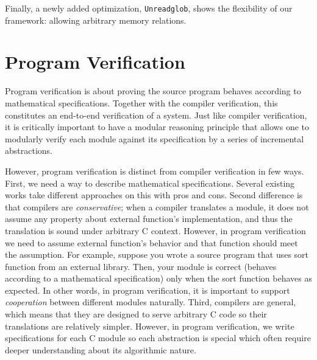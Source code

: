 Finally, a newly added optimization, \texttt{Unreadglob}, shows the flexibility of our framework:
allowing arbitrary memory relations.





\section{Program Verification}\label{sec:overview:program}

Program verification is about proving the source program behaves according to mathematical specifications.
Together with the compiler verification, this constitutes an end-to-end verification of a system.
Just like compiler verification, it is critically important to have a modular reasoning principle that allows one to modularly verify each module against its specification by a series of incremental abstractions.

However, program verification is distinct from compiler verification in few ways.
%
First, we need a way to describe mathematical specifications. Several existing works \cite{lorch:armada, jung:irisjfp, VST, gu:dscal} take different approaches on this with pros and cons.
%
Second difference is that compilers are {\it conservative}; when a compiler translates a module, it does not assume any property about external function's implementation, and thus the translation is sound under arbitrary C context.
However, in program verification we need to assume external function's behavior and that function should meet the assumption.
For example, suppose you wrote a source program that uses sort function from an external library.
Then, your module is correct (behaves according to a mathematical specification) only when the sort function behaves as expected.
In other words, in program verification, it is important to support {\it cooperation} between different modules naturally.
%
Third, compilers are general, which means that they are designed to serve arbitrary C code so their translations are relatively simpler.
However, in program verification, we write specifications for each C module so each abstraction is special which often require deeper understanding about its algorithmic nature.




